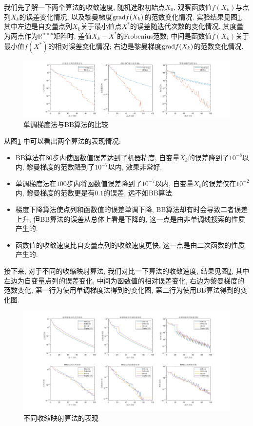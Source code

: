\documentclass[UTF8]{ctexart}
\begin{document}
我们先了解一下两个算法的收敛速度, 随机选取初始点$X_0$, 观察函数值$f(X_k)$与点列$X_k$的误差变化情况, 以及黎曼梯度$\textup{grad}f(X_k)$的范数变化情况. 实验结果见图\ref{fig1}, 其中左边是自变量点列$X_k$关于最小值点$X^*$的误差随迭代次数的变化情况, 其度量为两点作为$\mathbb{R}^{n\times p}$矩阵时, 差值$X_k-X^*$的Frobenius范数; 中间是函数值$f(X_k)$关于最小值$f(X^*)$的相对误差变化情况; 右边是黎曼梯度$\textup{grad}f(X_k)$的范数变化情况. 

\begin{figure}[htb]
    \centering
    \includegraphics[width=\textwidth]{Q2-figure/1.png}
    \caption{单调梯度法与BB算法的比较}\label{fig1}
\end{figure}

从图\ref{fig1} 中可以看出两个算法的表现情况: 
\begin{itemize}
    \item BB算法在$80$步内使函数值误差达到了机器精度, 自变量$X_k$的误差降到了$10^{-8}$以内, 黎曼梯度的范数降到了$10^{-7}$以内, 效果非常好. 
    \item 单调梯度法在$100$步内将函数值误差降到了$10^{-7}$以内, 自变量$X_k$的误差仅在$10^{-2}$内, 黎曼梯度的范数更是有$0.1$的误差, 远不如BB算法. 
    \item 梯度下降算法使点列和函数值的误差单调下降, BB算法却有时会导致二者误差上升, 但BB算法的误差从总体上看是下降的, 这一点是由非单调线搜索的性质产生的. 
    \item 函数值的收敛速度比自变量点列的收敛速度更快, 这一点是由二次函数的性质产生的.
\end{itemize}

接下来, 对于不同的收缩映射算法, 我们对比一下算法的收敛速度, 结果见图\ref{fig2}, 其中左边为自变量点列的误差变化, 中间为函数值的相对误差变化, 右边为黎曼梯度的范数变化, 第一行为使用单调梯度法得到的变化图, 第二行为使用BB算法得到的变化图. 

\begin{figure}[htb]
    \centering
    \includegraphics[width=\textwidth]{Q2-figure/2.png}
    \caption{不同收缩映射算法的表现}\label{fig2}
\end{figure}
\end{document}
